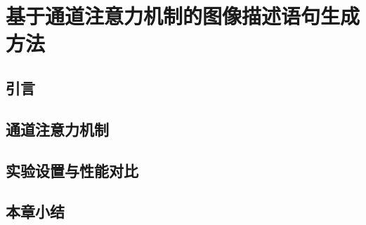 \chapter{基于通道注意力机制的图像描述语句生成方法}

\section{引言}

\section{通道注意力机制}

\section{实验设置与性能对比}

\section{本章小结}